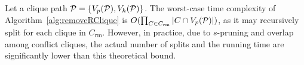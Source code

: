 

Let a clique path $\TPath = \{V_p(\TPath), V_h(\TPath)\}$.
The worst-case time complexity of Algorithm~\ref{alg:removeRClique} is $O(\prod_{C \in C_{\mathrm{rm}}} |C \cap V_p(\TPath)|)$, as it may 
recursively split for each clique in $C_{\mathrm{rm}}$. However, in practice, due to $s$-pruning and overlap among conflict cliques, the actual number of splits and the running time are significantly lower than this theoretical bound.
